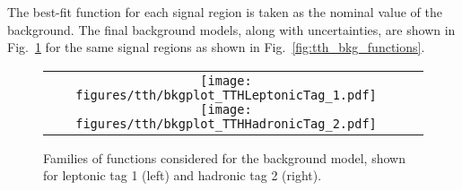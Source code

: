 The best-fit function for each signal region is taken as the nominal value of the background.
The final background models, along with uncertainties, are shown in Fig.~\ref{fig:tth_bkg_models} for the same signal regions as shown in Fig.~\ref{fig:tth_bkg_functions}.
\begin{figure} [h!]
    \centering
    \begin{tabular}{c c}
        \texttt{[image: figures/tth/bkgplot\_TTHLeptonicTag\_1.pdf]}
        \texttt{[image: figures/tth/bkgplot\_TTHHadronicTag\_2.pdf]}
    \end{tabular}
    \caption{Families of functions considered for the background model, shown for leptonic tag 1 (left) and hadronic tag 2 (right).}
    \label{fig:tth_bkg_models}
\end{figure}
